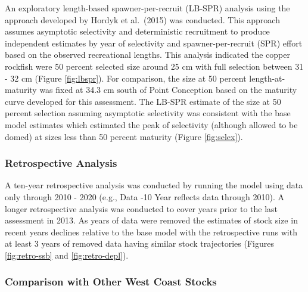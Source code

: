 \documentclass[11pt,
  english,
  a4paper,
]{article}
\begin{document}
An exploratory length-based spawner-per-recruit (LB-SPR) analysis using the approach developed by Hordyk et al.~{(2015)\leavevmode\tagmcend\tagstructend} was conducted. This approach assumes asymptotic selectivity and deterministic recruitment to produce independent estimates by year of selectivity and spawner-per-recruit (SPR) effort based on the observed recreational lengths. This analysis indicated the copper rockfish were 50 percent selected size around 25 cm with full selection between 31 - 32 cm (Figure \ref{fig:lbspr}). For comparison, the size at 50 percent length-at-maturity was fixed at 34.3 cm south of Point Conception based on the maturity curve developed for this assessment. The LB-SPR estimate of the size at 50 percent selection assuming asymptotic selectivity was consistent with the base model estimates which estimated the peak of selectivity (although allowed to be domed) at sizes less than 50 percent maturity (Figure \ref{fig:selex}).

\leavevmode\tagmcend\tagstructend\par


\hypertarget{retrospective-analysis}{%
\subsubsection{Retrospective Analysis}\label{retrospective-analysis}}

\leavevmode\tagmcend\tagstructend


A ten-year retrospective analysis was conducted by running the model using data only through 2010 - 2020 (e.g., Data -10 Year reflects data through 2010). A longer retrospective analysis was conducted to cover years prior to the last assessment in 2013. As years of data were removed the estimates of stock size in recent years declines relative to the base model with the retrospective runs with at least 3 years of removed data having similar stock trajectories (Figures \ref{fig:retro-ssb} and \ref{fig:retro-depl}).

\leavevmode\tagmcend\tagstructend\par


\hypertarget{comparison-with-other-west-coast-stocks}{%
\subsubsection{Comparison with Other West Coast Stocks}\label{comparison-with-other-west-coast-stocks}}
\end{document}
